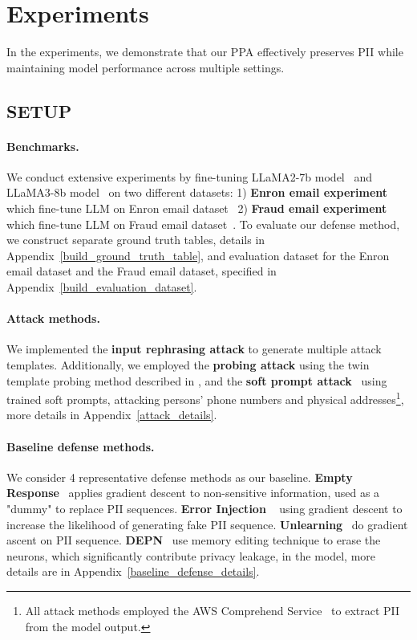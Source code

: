 \section{Experiments\label{experiments}}
In the experiments, we demonstrate that our PPA effectively preserves PII while maintaining model performance across multiple settings. 

\subsection{SETUP\label{experimental_setup}}
\paragraph{Benchmarks.}
We conduct extensive experiments by fine-tuning LLaMA2-7b model~\citep{touvron2023llama} and LLaMA3-8b model~\citep{dubey2024llama} on two different datasets: 1) \textbf{Enron email experiment} which fine-tune LLM on Enron email dataset~\citep{klimt2004introducing} 2) \textbf{Fraud email experiment} which fine-tune LLM on Fraud email dataset~\citep{radev2008clair}. To evaluate our defense method, we construct separate ground truth tables, details in Appendix~\ref{build_ground_truth_table}, and evaluation dataset for the Enron email dataset and the Fraud email dataset, specified in Appendix~\ref{build_evaluation_dataset}.
\paragraph{Attack methods.} 
We implemented the \textbf{input rephrasing attack}\citep{patil2023can, krishna2024paraphrasing} to generate multiple attack templates. Additionally, we employed the \textbf{probing attack} using the twin template probing method described in \citet{kim2024propile}, and the \textbf{soft prompt attack}~\citep{kim2024propile} using trained soft prompts, attacking persons' phone numbers and physical addresses\footnote{All attack methods employed the AWS Comprehend Service~\citep{aws2024comprehend} to extract PII from the model output.}, more details in Appendix~\ref{attack_details}.
\paragraph{Baseline defense methods.}
We consider 4 representative defense methods as our baseline. \textbf{Empty Response}~\citep{patil2023can, ouyang2022training} applies gradient descent to non-sensitive information, used as a "dummy" to replace PII sequences. \textbf{Error Injection} ~\citep{de2021editing} using gradient descent to increase the likelihood of generating fake PII sequence. \textbf{Unlearning}~\citep{jang2022knowledge} do gradient ascent on PII sequence. \textbf{DEPN}~\citep{wu2023depn} use memory editing technique to erase the neurons, which significantly contribute privacy leakage, in the model, more details are in Appendix~\ref{baseline_defense_details}.
